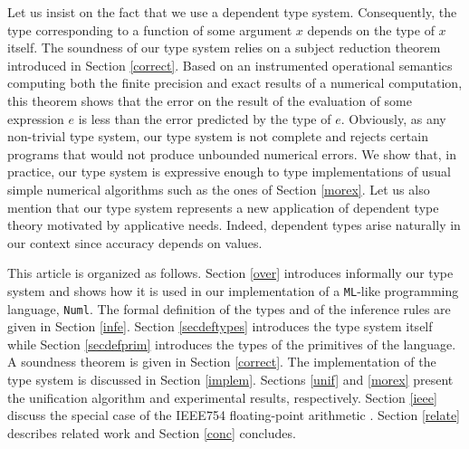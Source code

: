  Let us insist on the fact that we use a dependent type system. Consequently, the type corresponding to a function of some argument $x$ 
 depends on the type of $x$ itself. 
The soundness of our type system relies on a subject reduction theorem introduced in Section \ref{correct}.
Based on an instrumented operational semantics computing both the finite precision and exact results
of a numerical computation,  this theorem shows that the error on the result of the evaluation of some expression $e$ is less 
than the error predicted by the type of $e$.
Obviously, as any non-trivial type system, our type system is not complete and rejects certain
 programs that would not produce unbounded numerical errors. 
 We show that, in practice,  our type system  is expressive enough  to type implementations 
 of usual simple numerical algorithms \cite{Atk89} such as the ones of Section \ref{morex}. 
Let us also mention that our type system represents a new application of dependent type theory motivated
by applicative needs. Indeed, dependent types arise naturally in our context since accuracy depends on values.

This article is organized as follows. Section \ref{over} introduces informally our type system and shows how it is used in our implementation of 
a \texttt{ML}-like programming language, \texttt{Numl}.
The formal definition of the types and of the inference rules are given in Section \ref{infe}.
Section \ref{secdeftypes} introduces the type system itself while Section \ref{secdefprim}
introduces the types of the primitives of the language.
A soundness theorem is given in Section \ref{correct}. 
The implementation of the type system is discussed in Section \ref{implem}.
Sections \ref{unif} and \ref{morex} present the unification algorithm and experimental results, respectively.
Section \ref{ieee} discuss the special case of the IEEE754 floating-point arithmetic \cite{IEEE754}.
Section \ref{relate} describes related work 
 and Section \ref{conc} concludes.
